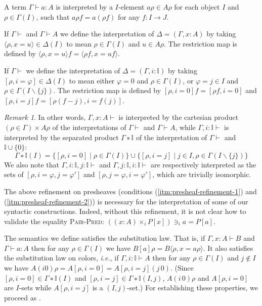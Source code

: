 \documentclass[english]{PaperTools/latex/entcs}
\theoremstyle{plain}
\theoremstyle{definition}
\theoremstyle{remark}
\newtheorem*{remark}{Remark}
\newcommand\CTimes[2]{(#2) ×_{#1}}
\newcommand\op[1]{∋_{#1}}
\def\ie{\textit{i.e.}}
\begin{document}
A term $Γ ⊢ a : A$ is interpreted by a $I$-element $aρ ∈ Aρ$ for each
object $I$ and $ρ ∈ Γ(I)$, such that $aρf = a(ρf)$ for any $f : I → J$.

If $Γ⊢$ and $Γ ⊢ A$ we define the interpretation of $Δ = (Γ,x:A)$
by taking $⟨ρ,x=u⟩ ∈ Δ(I)$ to mean $ρ ∈ Γ(I)$ and $u ∈ Aρ$.
The restriction map is defined by $⟨ρ,x=u⟩f = ⟨ρf, x=uf⟩$.

If $Γ⊢$ we define the interpretation of $Δ = (Γ,i:𝕀)$ by taking
$[ρ,i=φ] ∈ Δ(I)$ to mean either $φ = 0$ and $ρ ∈ Γ(I)$, or
$φ = j ∈ I$ and $ρ ∈ Γ(I\backslash\{j\})$.
The restriction map is defined by
$[ρ,i=0]f = [ρf,i=0]$ and $[ρ,i=j]f = [ρ(f-j),i=f(j)]$.
\begin{remark}
  In other words,
  $Γ,x:A⊢$ is interpreted by the cartesian product $(ρ∈Γ) × Aρ$ of the
  interpretations of $Γ⊢$ and $Γ⊢A$, while
  $Γ,i:𝕀⊢$ is interpreted by the separated product \cite[sec.~3.4
  p.~54]{PittsAM:nomsns} $Γ ∗ 𝕀$ of the
  interpretation of $Γ⊢$ and $𝕀 ∪ \{0\}$:
  $$Γ ∗ 𝕀(I) = \{ [ρ,i=0] \mid ρ ∈ Γ(I) \} ∪
               \{ [ρ,i=j] \mid j ∈ I, ρ ∈ Γ(I\backslash\{j\}) \}$$
  We also note that $Γ,i:𝕀,j:𝕀 ⊢$ and $Γ,j:𝕀,i:𝕀 ⊢$ are respectively
  interpreted as the sets of $[ρ,i=φ,j=φ']$ and $[ρ,j=φ,i=φ']$, which are
  trivially isomorphic.
\end{remark}

The above refinement on presheaves (conditions
(\ref{itm:presheaf-refinement-1}) and
(\ref{itm:presheaf-refinement-2})) is necessary for the interpretation
of some of our syntactic constructions.  Indeed, without this refinement,
it is not clear how to validate the equality \textsc{Pair-Pred}:
${{(\CTimes i {x:A} P[x])} \op i a = P[a]}$.

\smallskip
The semantics we define satisfies the substitution law. That is, if $Γ,x:A ⊢ B$
and $Γ ⊢ a:A$ then for any $ρ ∈ Γ(I)$ we have
$B[a]ρ = B⟨ρ,x=aρ⟩$.
It also satisfies the substitution law on colors, \ie, if $Γ,i:𝕀 ⊢ A$
then for any $ρ ∈ Γ(I)$ and $j ∉ I$ we have
$A(i 0)ρ = A[ρ,i=0] = A[ρ,i=j](j\, 0)$.
(Since $[ρ,i=0] ∈ Γ∗𝕀(I)$ and $[ρ,i=j] ∈ Γ∗𝕀(I,j)$, $A(i\, 0)ρ$ and
$A[ρ,i=0]$ are $I$-sets while $A[ρ,i=j]$ is a $(I,j)$-set.)
For establishing these properties, we proceed as \citet{Aczel98onrelating}.
\end{document}
